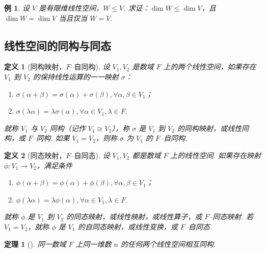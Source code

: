 \documentclass[zihao=-4,UTF8,linespread=1.8,nothm]{aytony_base}
\newtheorem{theorem}{\indent 定理}[subsection]
\newtheorem{definition}{\indent 定义}[subsection]
\newtheorem{example}{\indent 例}[subsection]
\begin{document}
\setcounter{example}{5}
\begin{example}
    设 $V$ 是有限维线性空间，$W \leqslant V$. 求证：$\dim W \leqslant \dim V$，且 $\dim W = \dim V$ 当且仅当 $W = V$.
\end{example}

\subsection{线性空间的同构与同态}

\begin{definition}[同构映射，$F$--自同构]
    设 $V_1, V_2$ 是数域 $F$ 上的两个线性空间，如果存在 $V_1$ 到 $V_2 $ 的保持线性运算的一一映射 $\sigma$：
    \begin{enumerate}[nosep]
        \item $\sigma(\alpha + \beta) = \sigma(\alpha) + \sigma(\beta), \forall \alpha, \beta \in V_1$；
        \item $\sigma (\lambda \alpha) = \lambda \sigma(\alpha), \forall \alpha \in V_1, \lambda \in F$.
    \end{enumerate}
    就称 $V_1$ 与 $V_2$ 同构（记作 $V_1\cong V_2$），称 $\sigma$ 是 $V_1$ 到 $V_2$ 的同构映射，或线性同构，或 $F$--同构. 如果 $V_1 = V_2$，则称 $\sigma$ 为 $V_1$ 的 $F$--自同构.
\end{definition}

\begin{definition}[同态映射，$F$--自同态]
    设 $V_1, V_2$ 都是数域 $F$ 上的线性空间. 如果存在映射 $\phi:V_1 \to V_2$，满足条件
    \begin{enumerate}[nosep]
        \item $\phi(\alpha + \beta) = \phi(\alpha) + \phi(\beta), \forall \alpha, \beta \in V_1$；
        \item $\phi(\lambda \alpha) = \lambda \phi(\alpha), \forall \alpha \in V_1, \lambda \in F$.
    \end{enumerate}
    就称 $\phi$ 是 $V_1$ 到 $V_2$ 的同态映射，或线性映射，或线性算子，或 $F$--同态映射. 若 $V_1 = V_2$，就称 $\phi$ 是 $V_1$ 的自同态映射，或线性变换，或 $F$--自同态.
\end{definition}

\begin{theorem}[]
    同一数域 $F$ 上同一维数 $n$ 的任何两个线性空间相互同构.
\end{theorem}
\end{document}
